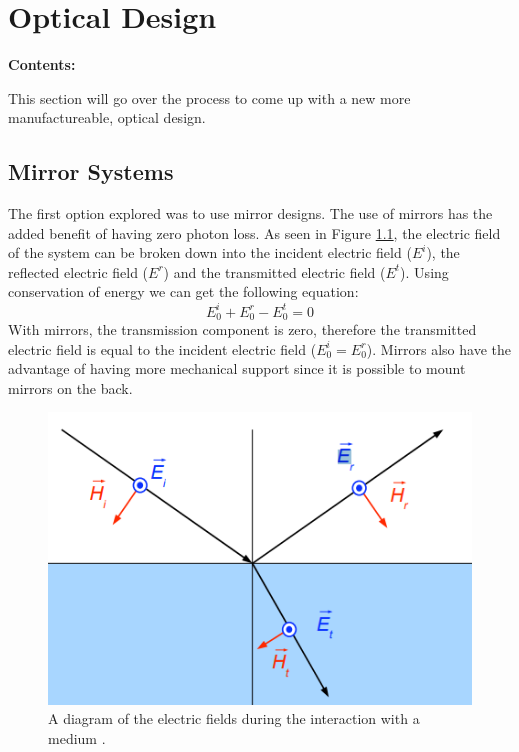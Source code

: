 
\chapter{Optical Design} %
\noindent\textbf{\large Contents:}

\noindent\hrulefill
\noindent\startcontents[chapters]
\noindent{}
\noindent\hrulefill
\label{Chapter3} %

This section will go over the process to come up with a new more manufactureable, optical design.  


\section{Mirror Systems}
\label{sec:mirror_sys}

The first option explored was to use mirror designs.  The use of mirrors has the 
added benefit of having zero photon loss.  As seen in Figure \ref{fig:reflect_diag}, the 
electric field of the system can be broken down into the incident electric field ($E^i$),
the reflected electric field ($E^r$) and the transmitted electric field ($E^t$).  Using conservation of energy we can get the following equation:
\begin{equation}
    E_0^i + E_0^r - E_0^t = 0
\end{equation}
With mirrors, the transmission component is zero, therefore the transmitted electric field
is equal to the incident electric field ($E_0^i = E_0^r$).  Mirrors also have the advantage of having more mechanical support since it is possible to mount mirrors on the back. 

\begin{figure}[h!]
\centering
\includegraphics[width=8 cm]{Figures/reflection.png}
\caption{A diagram of the electric fields during the interaction with a medium \cite{keller_2019}.}
\label{fig:reflect_diag}
\end{figure}



